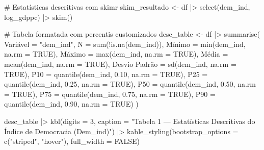 \documentclass[
  portuguese,
  letterpaper,
  DIV=11,
  numbers=noendperiod]{scrartcl}
\newenvironment{Shaded}{\begin{snugshade}}{\end{snugshade}}
\newcommand{\AttributeTok}[1]{\textcolor[rgb]{0.40,0.45,0.13}{#1}}
\newcommand{\CommentTok}[1]{\textcolor[rgb]{0.37,0.37,0.37}{#1}}
\newcommand{\ConstantTok}[1]{\textcolor[rgb]{0.56,0.35,0.01}{#1}}
\newcommand{\DecValTok}[1]{\textcolor[rgb]{0.68,0.00,0.00}{#1}}
\newcommand{\FloatTok}[1]{\textcolor[rgb]{0.68,0.00,0.00}{#1}}
\newcommand{\FunctionTok}[1]{\textcolor[rgb]{0.28,0.35,0.67}{#1}}
\newcommand{\NormalTok}[1]{\textcolor[rgb]{0.00,0.23,0.31}{#1}}
\newcommand{\OtherTok}[1]{\textcolor[rgb]{0.00,0.23,0.31}{#1}}
\newcommand{\SpecialCharTok}[1]{\textcolor[rgb]{0.37,0.37,0.37}{#1}}
\newcommand{\StringTok}[1]{\textcolor[rgb]{0.13,0.47,0.30}{#1}}
\begin{document}
\begin{Shaded}
\begin{Highlighting}[]
\CommentTok{\# Estatísticas descritivas com skimr}
\NormalTok{skim\_resultado }\OtherTok{\textless{}{-}}\NormalTok{ df }\SpecialCharTok{|\textgreater{}}
  \FunctionTok{select}\NormalTok{(dem\_ind, log\_gdppc) }\SpecialCharTok{|\textgreater{}}
  \FunctionTok{skim}\NormalTok{()}

\CommentTok{\# Tabela formatada com percentis customizados}
\NormalTok{desc\_table }\OtherTok{\textless{}{-}}\NormalTok{ df }\SpecialCharTok{|\textgreater{}}
  \FunctionTok{summarise}\NormalTok{(}
\NormalTok{    Variável     }\OtherTok{=} \StringTok{"dem\_ind"}\NormalTok{,}
    \AttributeTok{N            =} \FunctionTok{sum}\NormalTok{(}\SpecialCharTok{!}\FunctionTok{is.na}\NormalTok{(dem\_ind)),}
\NormalTok{    Mínimo       }\OtherTok{=} \FunctionTok{min}\NormalTok{(dem\_ind, }\AttributeTok{na.rm =} \ConstantTok{TRUE}\NormalTok{),}
\NormalTok{    Máximo       }\OtherTok{=} \FunctionTok{max}\NormalTok{(dem\_ind, }\AttributeTok{na.rm =} \ConstantTok{TRUE}\NormalTok{),}
\NormalTok{    Média        }\OtherTok{=} \FunctionTok{mean}\NormalTok{(dem\_ind, }\AttributeTok{na.rm =} \ConstantTok{TRUE}\NormalTok{),}
    \StringTok{\textasciigrave{}}\AttributeTok{Desvio Padrão}\StringTok{\textasciigrave{}} \OtherTok{=} \FunctionTok{sd}\NormalTok{(dem\_ind, }\AttributeTok{na.rm =} \ConstantTok{TRUE}\NormalTok{),}
    \StringTok{\textasciigrave{}}\AttributeTok{P10}\StringTok{\textasciigrave{}}        \OtherTok{=} \FunctionTok{quantile}\NormalTok{(dem\_ind, }\FloatTok{0.10}\NormalTok{, }\AttributeTok{na.rm =} \ConstantTok{TRUE}\NormalTok{),}
    \StringTok{\textasciigrave{}}\AttributeTok{P25}\StringTok{\textasciigrave{}}        \OtherTok{=} \FunctionTok{quantile}\NormalTok{(dem\_ind, }\FloatTok{0.25}\NormalTok{, }\AttributeTok{na.rm =} \ConstantTok{TRUE}\NormalTok{),}
    \StringTok{\textasciigrave{}}\AttributeTok{P50}\StringTok{\textasciigrave{}}        \OtherTok{=} \FunctionTok{quantile}\NormalTok{(dem\_ind, }\FloatTok{0.50}\NormalTok{, }\AttributeTok{na.rm =} \ConstantTok{TRUE}\NormalTok{),}
    \StringTok{\textasciigrave{}}\AttributeTok{P75}\StringTok{\textasciigrave{}}        \OtherTok{=} \FunctionTok{quantile}\NormalTok{(dem\_ind, }\FloatTok{0.75}\NormalTok{, }\AttributeTok{na.rm =} \ConstantTok{TRUE}\NormalTok{),}
    \StringTok{\textasciigrave{}}\AttributeTok{P90}\StringTok{\textasciigrave{}}        \OtherTok{=} \FunctionTok{quantile}\NormalTok{(dem\_ind, }\FloatTok{0.90}\NormalTok{, }\AttributeTok{na.rm =} \ConstantTok{TRUE}\NormalTok{)}
\NormalTok{  )}

\NormalTok{desc\_table }\SpecialCharTok{|\textgreater{}}
  \FunctionTok{kbl}\NormalTok{(}\AttributeTok{digits =} \DecValTok{3}\NormalTok{,}
      \AttributeTok{caption =} \StringTok{"Tabela 1 — Estatísticas Descritivas do Índice de Democracia (Dem\_ind)"}\NormalTok{) }\SpecialCharTok{|\textgreater{}}
  \FunctionTok{kable\_styling}\NormalTok{(}\AttributeTok{bootstrap\_options =} \FunctionTok{c}\NormalTok{(}\StringTok{"striped"}\NormalTok{, }\StringTok{"hover"}\NormalTok{), }\AttributeTok{full\_width =} \ConstantTok{FALSE}\NormalTok{)}
\end{Highlighting}
\end{Shaded}
\end{document}
